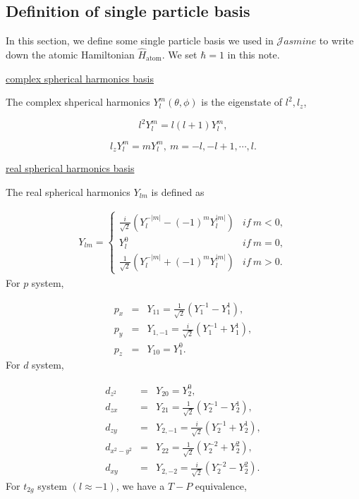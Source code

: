\subsection{Definition of single particle basis}
In this section, we define some single particle basis we used in $\mathcal{J}asmine$ to write down the atomic Hamiltonian $\hat{H}_{\text{atom}}$. We set $\hbar=1$ in this note.

\underline{complex spherical harmonics basis}

The complex shperical harmonics $Y_{l}^{m}(\theta,\phi)$ is the eigenstate of $l^{2},l_{z}$,

\begin{equation}
l^{2}Y_{l}^{m}=l(l+1)Y_{l}^{m},
\end{equation}

\begin{equation}
l_{z}Y_{l}^{m}=mY_{l}^{m},\ m=-l,-l+1,\cdots,l.
\end{equation}

\underline{real spherical harmonics basis}

The real spherical harmonics $Y_{lm}$ is defined as

\begin{gather}
Y_{lm}=\begin{cases}
\frac{i}{\sqrt{2}}\left(Y_{l}^{-|m|}-(-1)^{m}Y_{l}^{|m|}\right) & if\ m<0,\\
Y_{l}^{0} & if\ m=0,\\
\frac{1}{\sqrt{2}}\left(Y_{l}^{-|m|}+(-1)^{m}Y_{l}^{|m|}\right) & if\ m>0.
\end{cases}
\end{gather}
For $p$ system,

\begin{eqnarray}
p_{x} & = & Y_{11}=\frac{1}{\sqrt{2}}\left(Y_{1}^{-1}-Y_{1}^{1}\right),\nonumber \\
p_{y} & = & Y_{1,-1}=\frac{i}{\sqrt{2}}\left(Y_{1}^{-1}+Y_{1}^{1}\right),\\
p_{z} & = & Y_{10}=Y_{1}^{0}.\nonumber 
\end{eqnarray}
For $d$ system,

\begin{eqnarray}
d_{z^{2}} & = & Y_{20}=Y_{2}^{0},\nonumber \\
d_{zx} & = & Y_{21}=\frac{1}{\sqrt{2}}\left(Y_{2}^{-1}-Y_{2}^{1}\right),\nonumber \\
d_{zy} & = & Y_{2,-1}=\frac{i}{\sqrt{2}}\left(Y_{2}^{-1}+Y_{2}^{1}\right),\\
d_{x^{2}-y^{2}} & = & Y_{22}=\frac{1}{\sqrt{2}}\left(Y_{2}^{-2}+Y_{2}^{2}\right),\nonumber \\
d_{xy} & = & Y_{2,-2}=\frac{i}{\sqrt{2}}\left(Y_{2}^{-2}-Y_{2}^{2}\right).\nonumber 
\end{eqnarray}
For $t_{2g}$ system $(l\approx-1)$, we have a $T-P$ equivalence, 

